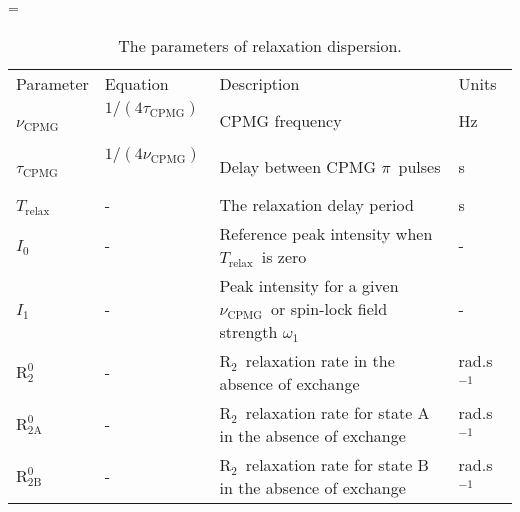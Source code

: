 \documentclass[a4paper,11pt,twoside,openright]{book}
\makeatletter
\let\realnormalsize=\normalsize
\def\liih@math{\ifmmode$\else\bad@math\fi}
\def\adjustnormalsize{\def\normalsize{\mathsurround=0pt \realnormalsize
 \parindent=0pt\abovedisplayskip=0pt\belowdisplayskip=0pt}%
 \def\phantompar{\csname par\endcsname}\normalsize}%
\newcommand\lthtmlvboxmathA{\adjustnormalsize\setbox\sizebox=\vbox\bgroup %
 \let\ifinner=\iffalse \let\)\liih@math }%
\newcommand\lthtmlmathtype[1]{\gdef\lthtmlmathenv{#1}}%
\newcommand\lthtmlfigureA[1]{\let\@savefreelist\@freelist
       \lthtmlmathtype{#1}\lthtmlvboxmathA}%
\makeatother
\begin{document}
{\newpage\clearpage
\lthtmlfigureA{landscape10608}%
\begin{landscape}

\begin{center}
\begin{small}
\par
\begin{longtable}{llll}
\par
\caption[The parameters of relaxation dispersion.]{The parameters of relaxation dispersion.}
\par
\\
\toprule
Parameter          & Equation                       & Description                                                                   & Units \\
\midrule
\endhead
\par
\bottomrule
\endfoot
\par
\par
$\nu_{\textrm{CPMG}}$\           & $1 / (4 \tau_{\textrm{CPMG}})$\              & CPMG frequency                                                                & Hz \\
$\tau_{\textrm{CPMG}}$\          & $1 / (4 \nu_{\textrm{CPMG}})$\               & Delay between CPMG $\pi$\  pulses                                               & s \\
$T_\textrm{relax}$\  & -                              & The relaxation delay period                                                   & s \\
$I_0$\               & -                              & Reference peak intensity when $T_\textrm{relax}$\  is zero                      & - \\
$I_1$\               & -                              & Peak intensity for a given $\nu_{\textrm{CPMG}}$\  or spin-lock field strength $\omega_1$\    & - \\
$\mathrm{R}_2^0$\         & -                              & $\mathrm{R}_2$\  relaxation rate in the absence of exchange                            & rad.s$^{-1}$\  \\
$\mathrm{R}_{\mathrm{2A}}^0$\        & -                              & $\mathrm{R}_2$\  relaxation rate for state A in the absence of exchange                & rad.s$^{-1}$\  \\
$\mathrm{R}_{\mathrm{2B}}^0$\        & -                              & $\mathrm{R}_2$\  relaxation rate for state B in the absence of exchange                & rad.s$^{-1}$\  \\

\end{longtable}
\end{small}
\end{center}
\end{landscape}}
\end{document}
